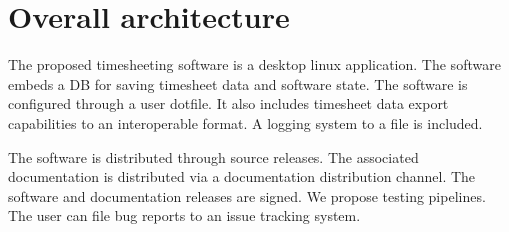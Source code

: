 \section{Overall architecture} \label{sec:overall}
The proposed timesheeting software is a desktop linux application.
The software embeds a \gls{DB} for saving timesheet data and software
state. The software is configured through a user dotfile. It also includes
timesheet data export capabilities to an interoperable format. A logging system
to a file is included.

The software is distributed through source releases. The associated
documentation is distributed via a documentation distribution channel.
The software and documentation releases are signed. We propose
testing pipelines. The user can file bug reports to an issue
tracking system.

